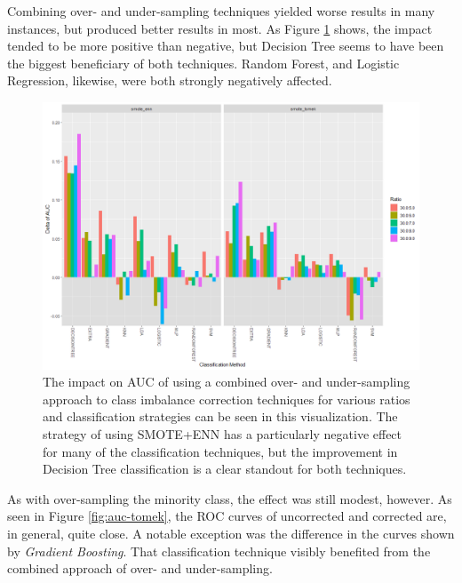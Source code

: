 \documentclass[letterpaper]{report}
\begin{document}
Combining over- and under-sampling techniques yielded worse results in many instances, but produced better results in most. As Figure \ref{fig:combined} shows, the impact tended to be more positive than negative, but Decision Tree seems to have been the biggest beneficiary of both techniques. Random Forest, and Logistic Regression, likewise, were both strongly negatively affected.
\begin{figure}[H]
	\centering
	\includegraphics[width=0.9\linewidth]{./figures/combined.png}
	\caption[Combined Over and Under-sampling]{The impact on AUC of using a combined over- and under-sampling approach to class imbalance correction techniques for various ratios and classification strategies can be seen in this visualization. The strategy of using SMOTE+ENN has a particularly negative effect for many of the classification techniques, but the improvement in Decision Tree classification is a clear standout for both techniques.}
	\label{fig:combined}
\end{figure}

As with over-sampling the minority class, the effect was still modest, however. As seen in Figure \ref{fig:auc-tomek}, the ROC curves of uncorrected and corrected are, in general, quite close.  A notable exception was the difference in the curves shown by \textit{Gradient Boosting}. That classification technique visibly benefited from the combined approach of over- and under-sampling.
\end{document}
